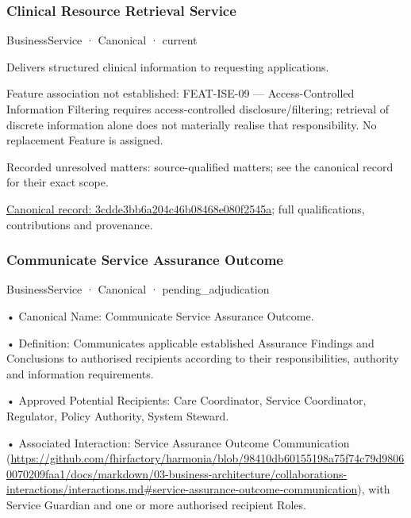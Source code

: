 \subsubsection{Clinical Resource Retrieval Service}

\label{element:3cdde3bb6a204c46b08468e080f2545a}
{\small BusinessService · Canonical · current}\par

Delivers structured clinical information to requesting applications.



Feature association not established: FEAT-ISE-09 — Access-Controlled Information Filtering requires access-controlled disclosure/filtering; retrieval of discrete information alone does not materially realise that responsibility. No replacement Feature is assigned.


{\small Recorded unresolved matters: source-qualified matters; see the canonical record for their exact scope.}\par
{\footnotesize \href{../../../../continuum/business/business-service/3cdde3bb6a204c46b08468e080f2545a.md}{Canonical record: 3cdde3bb6a204c46b08468e080f2545a}; full qualifications, contributions and provenance.}\par
\subsubsection{Communicate Service Assurance Outcome}

\label{element:371b04d6bbf84b53a3c5667ae6df2809}
{\small BusinessService · Canonical · pending\_adjudication}\par

•
Canonical Name: Communicate Service Assurance Outcome.



•
Definition: Communicates applicable established Assurance Findings and Conclusions to authorised recipients according to their responsibilities, authority and information requirements.



•
Approved Potential Recipients: Care Coordinator, Service Coordinator, Regulator, Policy Authority, System Steward.



•
Associated Interaction: Service Assurance Outcome Communication (\url{https://github.com/fhirfactory/harmonia/blob/98410db60155198a75f74c79d98060070209faa1/docs/markdown/03-business-architecture/collaborations-interactions/interactions.md#service-assurance-outcome-communication}), with Service Guardian and one or more authorised recipient Roles.



